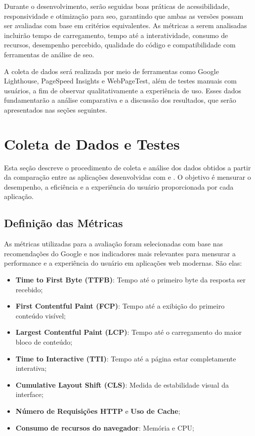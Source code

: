Durante o desenvolvimento, serão seguidas boas práticas de acessibilidade, responsividade e otimização para \acrshort{seo}, garantindo que ambas as versões possam ser avaliadas com base em critérios equivalentes. As métricas a serem analisadas incluirão tempo de carregamento, tempo até a interatividade, consumo de recursos, desempenho percebido, qualidade do código e compatibilidade com ferramentas de análise de \acrshort{seo}.

A coleta de dados será realizada por meio de ferramentas como Google Lighthouse, PageSpeed Insights e WebPageTest, além de testes manuais com usuários, a fim de observar qualitativamente a experiência de uso. Esses dados fundamentarão a análise comparativa e a discussão dos resultados, que serão apresentados nas seções seguintes.

\section{Coleta de Dados e Testes}
\label{sec:coleta-de-dados-e-testes}

Esta seção descreve o procedimento de coleta e análise dos dados obtidos a partir da comparação entre as aplicações desenvolvidas com  e . O objetivo é mensurar o desempenho, a eficiência e a experiência do usuário proporcionada por cada aplicação.

\subsection{Definição das Métricas}

As métricas utilizadas para a avaliação foram selecionadas com base nas recomendações do Google e nos indicadores mais relevantes para mensurar a performance e a experiência do usuário em aplicações web modernas. São elas:

\begin{itemize}
    \item \textbf{Time to First Byte (TTFB)}: Tempo até o primeiro byte da resposta ser recebido;
    \item \textbf{First Contentful Paint (FCP)}: Tempo até a exibição do primeiro conteúdo visível;
    \item \textbf{Largest Contentful Paint (LCP)}: Tempo até o carregamento do maior bloco de conteúdo;
    \item \textbf{Time to Interactive (TTI)}: Tempo até a página estar completamente interativa;
    \item \textbf{Cumulative Layout Shift (CLS)}: Medida de estabilidade visual da interface;
    \item \textbf{Número de Requisições HTTP} e \textbf{Uso de Cache};
    \item \textbf{Consumo de recursos do navegador}: Memória e CPU;
\end{itemize}

